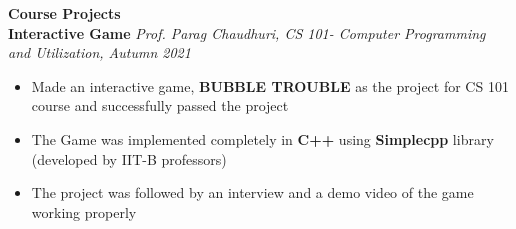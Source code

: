 \documentclass[]{article}
\begin{document}
\textcolor{blue!60!black}{\Large \textbf{Course Projects}}
\vspace{1em}\\
\textbf{Interactive Game}
\hfill\textit{\small Prof. Parag Chaudhuri, CS 101- Computer Programming and Utilization, Autumn 2021}
\begin{itemize}
    \item Made an interactive game, \textbf{BUBBLE TROUBLE} as the project for CS 101 course and successfully passed the project
    \item The Game was implemented completely in \textbf{C++} using \textbf{Simplecpp} library (developed by IIT-B professors)
    \item The project was followed by an interview and a demo video of the game working properly
\end{itemize}
\vspace{1.25 em}
\end{document}
